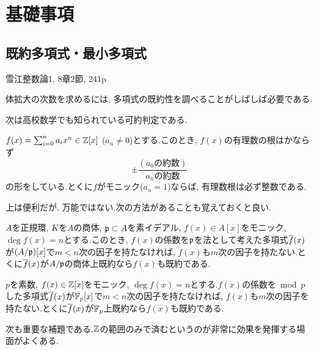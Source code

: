 \section{基礎事項}
\subsection{既約多項式・最小多項式}

\ben
\item 雪江整数論1, 8章2節, 241p~
\een


体拡大の次数を求めるには, 多項式の既約性を調べることがしばしば必要である.

次は高校数学でも知られている可約判定である.
\begin{prop}
$f(x) = \sum_{i=0}^{n} a_i x^{n}\in \mathbb{Z}[x]$ ($a_n\neq 0$)とする.このとき, $f(x)$の有理数の根はかならず
\[\pm \dfrac{(\text{$a_0$の約数})}{\text{$a_n$の約数}}\]
の形をしている.とくに$f$がモニック($a_n=1$)ならば, 有理数根は必ず整数である.
\end{prop}
上は便利だが, 万能ではない.次の方法があることも覚えておくと良い.
\begin{prop}
$A$を正規環, $K$を$A$の商体, $\mathfrak{p}\subset A$を素イデアル, $f(x) \in A[x]$をモニック, $\deg{f(x)} = n$とする.このとき, $f(x)$の係数を$\mathfrak{p}$を法として考えた多項式$\overline{f}(x)$が$(A/\mathfrak{p})[x]$で$m<n$次の因子を持たなければ, $f(x)$も$m$次の因子を持たない.とくに$\overline{f}(x)$が$A/\mathfrak{p}$の商体上既約なら$f(x)$も既約である.
\end{prop}
\begin{cor}
$p$を素数, $f(x)\in \mathbb{Z}[x]$をモニック, $\deg{f(x)} = n$とする.$f(x)$の係数を$\bmod{p}$した多項式$\overline{f}(x)$が$\mathbb{F}_{p}[x]$で$m<n$次の因子を持たなければ, $f(x)$も$m$次の因子を持たない.とくに$\overline{f}(x)$が$\mathbb{F}_{p}$上既約なら$f(x)$も既約である.
\end{cor}
次も重要な補題である.$\mathbb{Z}$の範囲のみで済むというのが非常に効果を発揮する場面がよくある.
